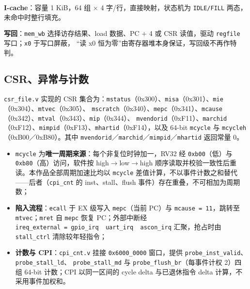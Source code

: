 \textbf{I-cache}：容量 1 KiB，64 组 $\times$ 4 字/行，直接映射，状态机为 \texttt{IDLE/\allowbreak{}FILL} 两态，未命中时整行填充。

\textbf{写回}：\texttt{mem\_\allowbreak{}wb} 选择访存结果、load 数据、PC + 4 或 CSR 读值，驱动 \texttt{regfile} 写口；\texttt{x0} 于写口屏蔽， ``读 x0 恒为零''由寄存器堆本身保证，写回级不再作特判。


\Needspace{85pt}

\subsection{CSR、异常与计数}\label{csrux5f02ux5e38ux4e0eux8ba1ux6570}

\texttt{csr\_\allowbreak{}file.\allowbreak{}v} 实现的 CSR 集合为：\texttt{mstatus}（0x300）、\texttt{misa}（0x301）、\texttt{mie}（0x304）、\texttt{mtvec}（0x305）、 \texttt{mscratch}（0x340）、\texttt{mepc}（0x341）、\texttt{mcause}（0x342）、\texttt{mtval}（0x343）、\texttt{mip}（0x344）、 \texttt{mvendorid}（0xF11）、\texttt{marchid}（0xF12）、\texttt{mimpid}（0xF13）、\texttt{mhartid}（0xF14），以及 64-bit \texttt{mcycle} 与 \texttt{mcycleh}（0xB00／0xB80）。其中 \texttt{mvendorid}／\texttt{marchid}／\texttt{mimpid}／\texttt{mhartid} 返回常量 0。

\begin{itemize}
\tightlist
\item
  \texttt{mcycle} 为\textbf{唯一周期来源}：每个非复位时钟加一，RV32 经 \texttt{0xb00}（低）与 \texttt{0xb80}（高）访问，软件按 high$\rightarrow$low$\rightarrow$high 顺序读取并校验一致性后重读。本作品全部周期加速比均以 \texttt{mcycle} 差值计算，不以事件计数之和替代------后者（\texttt{cpi\_\allowbreak{}cnt} 的 inst、stall、flush 事件）存在重叠，不可相加为周期数；
\item
  \textbf{陷入流程}：\texttt{ecall} 于 EX 级写入 \texttt{mepc}（当前 PC）与 \texttt{mcause\ =\ 11}，跳转至 \texttt{mtvec}；\texttt{mret} 自 \texttt{mepc} 恢复 PC；外部中断经 \texttt{ireq\_external\ =\ gpio\_irq\ \textbar{}\ uart\_irq\ \textbar{}\ ascon\_irq} 汇聚，抢占时由 \texttt{stall\_\allowbreak{}ctrl} 清除较年轻指令；
\item
  \textbf{计数与 CPI}：\texttt{cpi\_\allowbreak{}cnt.\allowbreak{}v} 挂接 \texttt{0x6000\_\allowbreak{}0000} 窗口，提供 \texttt{probe\_\allowbreak{}inst\_\allowbreak{}valid}、\texttt{probe\_\allowbreak{}stall\_\allowbreak{}ld}、 \texttt{probe\_\allowbreak{}stall\_\allowbreak{}md} 与 \texttt{probe\_\allowbreak{}flush\_\allowbreak{}br}（每事件计权 2）四组 64-bit 计数；CPI 以同一区间的 cycle delta 与已退休指令 delta 计算，不采用事件加权和。
\end{itemize}

